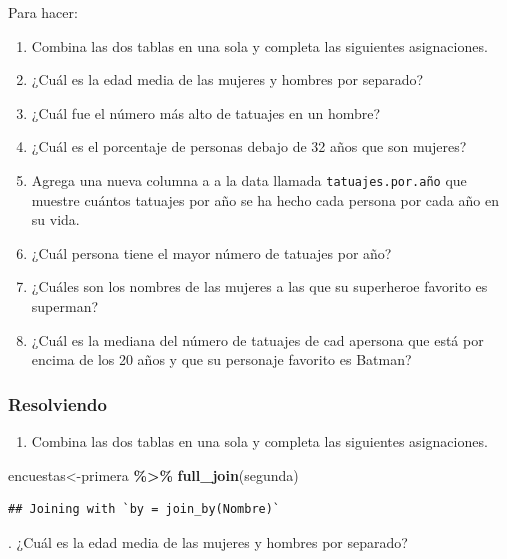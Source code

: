 \documentclass[
]{book}
\newenvironment{Shaded}{\begin{snugshade}}{\end{snugshade}}
\newcommand{\FunctionTok}[1]{\textcolor[rgb]{0.13,0.29,0.53}{\textbf{#1}}}
\newcommand{\NormalTok}[1]{#1}
\newcommand{\OtherTok}[1]{\textcolor[rgb]{0.56,0.35,0.01}{#1}}
\newcommand{\SpecialCharTok}[1]{\textcolor[rgb]{0.81,0.36,0.00}{\textbf{#1}}}
\providecommand{\tightlist}{%
  \setlength{\itemsep}{0pt}\setlength{\parskip}{0pt}}
\begin{document}
Para hacer:

\begin{enumerate}
\def\labelenumi{\arabic{enumi}.}
\item
  Combina las dos tablas en una sola y completa las siguientes asignaciones.
\item
  ¿Cuál es la edad media de las mujeres y hombres por separado?
\item
  ¿Cuál fue el número más alto de tatuajes en un hombre?
\item
  ¿Cuál es el porcentaje de personas debajo de 32 años que son mujeres?
\item
  Agrega una nueva columna a a la data llamada \texttt{tatuajes.por.año} que muestre cuántos tatuajes por año se ha hecho cada persona por cada año en su vida.
\item
  ¿Cuál persona tiene el mayor número de tatuajes por año?
\item
  ¿Cuáles son los nombres de las mujeres a las que su superheroe favorito es superman?
\item
  ¿Cuál es la mediana del número de tatuajes de cad apersona que está por encima de los 20 años y que su personaje favorito es Batman?\\
\end{enumerate}

\subsubsection{Resolviendo}\label{resolviendo-1}

\begin{enumerate}
\def\labelenumi{\arabic{enumi}.}
\tightlist
\item
  Combina las dos tablas en una sola y completa las siguientes asignaciones.\\
\end{enumerate}

\begin{Shaded}
\begin{Highlighting}[]
\NormalTok{encuestas}\OtherTok{\textless{}{-}}\NormalTok{primera }\SpecialCharTok{\%\textgreater{}\%} \FunctionTok{full\_join}\NormalTok{(segunda)}
\end{Highlighting}
\end{Shaded}

\begin{verbatim}
## Joining with `by = join_by(Nombre)`
\end{verbatim}

\hfill{}.
¿Cuál es la edad media de las mujeres y hombres por separado?\\
\end{document}

